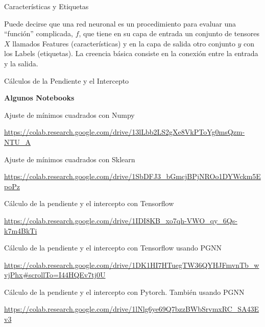 \documentclass[10pd,hyperref={colorlinks=true}]{beamer}
\begin{document}

\begin{frame}{Características y Etiquetas}

 \vfill

Puede decirse que una red neuronal es un procedimiento para evaluar una 
``función'' complicada, $f$, que tiene en su capa de entrada un conjunto 
de tensores $X$ llamados Features (características) y en la capa de 
salida otro conjunto $y$ con los Labels (etiquetas). La creencia básica 
consiste en la conexión entre la entrada y la salida.

{\color{red}{
\Huge
$$
y = f(X)
$$
}}

 \vfill

 \end{frame}


\begin{frame}{C\'alculos de la Pendiente y el Intercepto}

 \vfill


\vfill

\centerline{\textbf{Algunos Notebooks}}

\hfill

Ajuste de mínimos cuadrados con Numpy

\url{https://colab.research.google.com/drive/13lLbb2LS2gXe8VkPToYg0msQzm-NTU\_A}

 \vfill

Ajuste de mínimos cuadrados con Sklearn

\url{https://colab.research.google.com/drive/1SbDFJ3\_bGmcjBPjNROo1DYWckm5EpoPz}

 \vfill

Cálculo de la pendiente y el intercepto con Tensorflow

\url{https://colab.research.google.com/drive/1IDI8KB\_xo7qh-VWO\_qy\_6Qs-k7m4BkTi}

 \vfill

Cálculo de la pendiente y el intercepto con Tensorflow usando PGNN

\url{https://colab.research.google.com/drive/1DK1HI7HTuegTW36QYHJFmvnTb\_wvjPhx\#scrollTo=I44HQEv7tj0U}

 \vfill

Cálculo de la pendiente y el intercepto con Pytorch. También usando PGNN

\url{https://colab.research.google.com/drive/1lNlg6ye69Q7bzzBWbSrvmxRC\_SA43Ev3}

 \vfill

 \end{frame}
\end{document}
